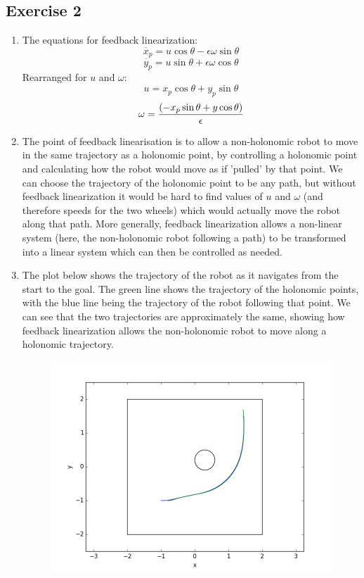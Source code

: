 \documentclass[12pt,a4paper]{article}
\begin{document}
\subsection*{Exercise 2}
\begin{enumerate}[label=(\alph*)]
	\item The equations for feedback linearization:
		$$\dot{x_p} = u\cos{\theta} - \epsilon \omega \sin{\theta}$$
		$$\dot{y_p} = u\sin{\theta} + \epsilon \omega \cos{\theta}$$
		Rearranged for $u$ and $\omega$:
		$$ u =x_p\cos{\theta} + y_p\sin{\theta} $$
		$$ \omega = {(-x_p\sin{\theta}+y\cos{\theta})\over{\epsilon}}$$
	\item The point of feedback linearisation is to allow a non-holonomic robot to move in the same trajectory as a holonomic point, by controlling a holonomic point and calculating how the robot would move as if 'pulled' by that point. We can choose the trajectory of the holonomic point to be any path, but without feedback linearization it would be hard to find values of $u$ and $\omega$ (and therefore speeds for the two wheels) which would actually move the robot along that path. More generally, feedback linearization allows a non-linear system (here, the non-holonomic robot following a path) to be transformed into a linear system which can then be controlled as needed.
	\item The plot below shows the trajectory of the robot as it navigates from the start to the goal. The green line shows the trajectory of the holonomic points, with the blue line being the trajectory of the robot following that point. We can see that the two trajectories are approximately the same, showing how feedback linearization allows the non-holonomic robot to move along a holonomic trajectory.
	\begin{figure}[!htb]
		\centering
		\includegraphics[width=\textwidth]{fig/2c.png}

\end{figure}
\end{enumerate}
\end{document}
